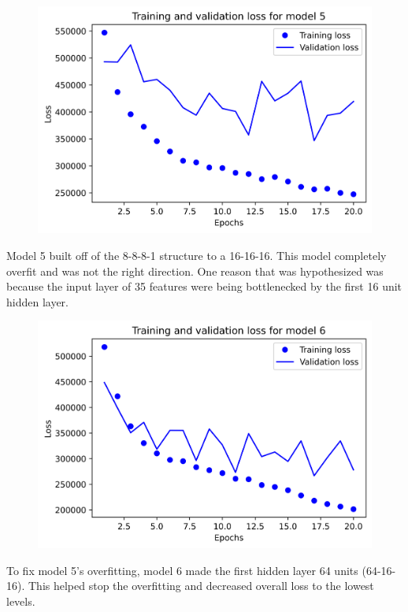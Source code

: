 \documentclass{article}
\begin{document}
    \begin{figure}[H]
        \includegraphics[width=\linewidth]{images/model5.png}
    \end{figure}
    Model 5 built off of the 8-8-8-1 structure to a 16-16-16. This model completely overfit and was not the right direction. 
    One reason that was hypothesized was because the input layer of 35 features were being bottlenecked by the first 16 unit hidden layer.

    \begin{figure}[H]
        \includegraphics[width=\linewidth]{images/model6.png}
    \end{figure}
    To fix model 5's overfitting, model 6 made the first hidden layer 64 units (64-16-16). This helped stop the overfitting and decreased overall 
    loss to the lowest levels.
\end{document}
